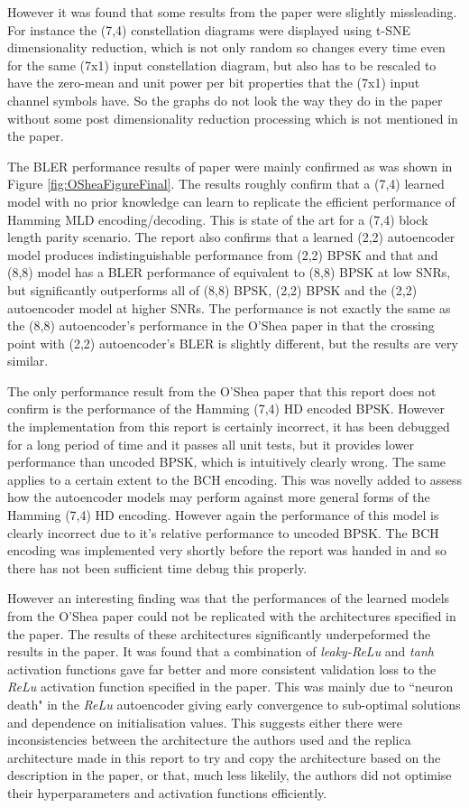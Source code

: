 \documentclass[12pt,onecolumn,letterpaper]{article}
\newcommand{\code}{\textit}
\begin{document}
However it was found that some results from the paper were slightly missleading. For instance the (7,4) constellation diagrams were displayed using t-SNE dimensionality reduction, which is not only random so changes every time even for the same (7x1) input constellation diagram, but also has to be rescaled to have the zero-mean and unit power per bit properties that the (7x1) input channel symbols have. So the graphs do not look the way they do in the paper without some post dimensionality reduction processing which is not mentioned in the paper.

The BLER performance results of paper were mainly confirmed as was shown in Figure \ref{fig:OSheaFigureFinal}. The results roughly confirm that a (7,4) learned model with no prior knowledge can learn to replicate the efficient performance of Hamming MLD encoding/decoding. This is state of the art for a (7,4) block length parity scenario. The report also confirms that a learned (2,2) autoencoder model produces indistinguishable performance from (2,2) BPSK and that and (8,8) model has a BLER performance of equivalent to (8,8) BPSK at low SNRs, but significantly outperforms all of (8,8) BPSK, (2,2) BPSK and the (2,2) autoencoder model at higher SNRs. The performance is not exactly the same as the (8,8) autoencoder's performance in the O'Shea paper in that the crossing point with (2,2) autoencoder's BLER is slightly different, but the results are very similar.

The only performance result from the O'Shea paper that this report does not confirm is the performance of the Hamming (7,4) HD encoded BPSK. However the implementation from  this report is certainly incorrect, it has been debugged for a long period of time and it passes all unit tests, but it provides lower performance than uncoded BPSK, which is intuitively clearly wrong. The same applies to a certain extent to the BCH encoding. This was novelly added to assess how the autoencoder models may perform against more general forms of the Hamming (7,4) HD encoding. However again the performance of this model is clearly incorrect due to it's relative performance to uncoded BPSK. The BCH encoding was implemented very shortly before the report was handed in and so there has not been sufficient time debug this properly.

However an interesting finding was that the performances of the learned models from the O'Shea paper could not be replicated with the architectures specified in the paper. The results of these architectures significantly underpeformed the results in the paper. It was found that a combination of \code{leaky-ReLu} and \code{tanh} activation functions gave far better and more consistent validation loss to the \code{ReLu} activation function specified in the paper. This was mainly due to ``neuron death" in the \code{ReLu} autoencoder giving early convergence to sub-optimal solutions and dependence on initialisation values. This suggests either there were inconsistencies between the architecture the authors used and the replica architecture made in this report to try and copy the architecture based on the description in the paper, or that, much less likelily, the authors did not optimise their hyperparameters and activation functions efficiently. 
\end{document}
